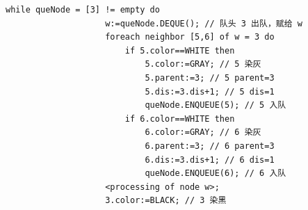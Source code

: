 \documentclass{article}
\begin{document}
\begin{enumerate}
\begin{itemize}
        \begin{lstlisting}[style=algorithmPPT]
                while queNode = [3] != empty do
                    w:=queNode.DEQUE(); // 队头 3 出队，赋给 w
                    foreach neighbor [5,6] of w = 3 do
                        if 5.color==WHITE then
                            5.color:=GRAY; // 5 染灰
                            5.parent:=3; // 5 parent=3
                            5.dis:=3.dis+1; // 5 dis=1
                            queNode.ENQUEUE(5); // 5 入队
                        if 6.color==WHITE then
                            6.color:=GRAY; // 6 染灰
                            6.parent:=3; // 6 parent=3
                            6.dis:=3.dis+1; // 6 dis=1
                            queNode.ENQUEUE(6); // 6 入队
                    <processing of node w>;
                    3.color:=BLACK; // 3 染黑
                \end{lstlisting}
    \end{itemize}

    \begin{figure}[htbp]
        \begin{minipage}[b]{0.6\textwidth}    %
            \centering
\end{minipage}
\end{figure}
\end{enumerate}
\end{document}
